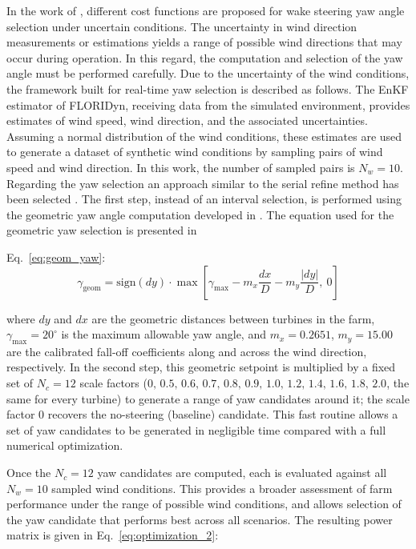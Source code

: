 \documentclass[final,5p,times,twocolumn]{elsarticle}
\begin{document}
In the work of \cite{Becker_2026}, different cost functions are proposed for wake steering yaw angle selection under uncertain conditions. The uncertainty in wind direction measurements or estimations yields a range of possible wind directions that may occur during operation. In this regard, the computation and selection of the yaw angle must be performed carefully. Due to the uncertainty of the wind conditions, the framework built for real-time yaw selection is described as follows.
The EnKF estimator of FLORIDyn, receiving data from the simulated environment, provides estimates of wind speed, wind direction, and the associated uncertainties. Assuming a normal distribution of the wind conditions, these estimates are used to generate a dataset of synthetic wind conditions by sampling pairs of wind speed and wind direction. In this work, the number of sampled pairs is $N_w=10$. Regarding the yaw selection an approach similar to the serial refine method has been selected \cite{serial_refine}. The first step, instead of an interval selection, is performed using the geometric yaw angle computation developed in \cite{baricchio}. The equation used for the geometric yaw selection is presented in

Eq.~\ref{eq:geom_yaw}:
\begin{equation}
\label{eq:geom_yaw}
\gamma_{\mathrm{geom}} = \mathrm{sign}(dy) \cdot \max\left[\gamma_{\max}
- m_{x}\frac{dx}{D} - m_{y}\frac{|dy|}{D},\ 0\right]
\end{equation}

where $dy$ and $dx$ are the geometric distances between turbines in the farm, $\gamma_{\max}=20^\circ$ is the maximum allowable yaw angle, and $m_x=0.2651$, $m_y=15.00$ are the calibrated fall-off coefficients along and across the wind direction, respectively.
In the second step, this geometric setpoint is multiplied by a fixed set of $N_c=12$ scale factors ($0,\,0.5,\,0.6,\,0.7,\,0.8,\,0.9,\,1.0,\,1.2,\,1.4,\,1.6,\,1.8,\,2.0$, the same for every turbine) to generate a range of yaw candidates around it; the scale factor $0$ recovers the no-steering (baseline) candidate. This fast routine allows a set of yaw candidates to be generated in negligible time compared with a full numerical optimization.

Once the $N_c=12$ yaw candidates are computed, each is evaluated against all $N_w=10$ sampled wind conditions. This provides a broader assessment of farm performance under the range of possible wind conditions, and allows selection of the yaw candidate that performs best across all scenarios. The resulting power matrix is given in Eq.~\ref{eq:optimization_2}:
\end{document}
